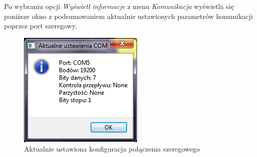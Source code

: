 \documentclass[a4paper,12pt]{article}
\begin{document}
Po wybraniu opcji \textit{Wyświetl informacje} z menu \textit{Komunikacja} wyświetla się poniższe okno z podsumowaniem aktualnie ustawionych parametrów komunikacji poprzez port szeregowy. 
\begin{figure} [H]
\centering
\includegraphics{app6_small.png}
\caption{Aktualnie ustawiona konfiguracja połączenia szeregowego}
\label{app6}
\end{figure}
\end{document}
